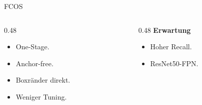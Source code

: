 \begin{frame}{FCOS}
\small
\begin{columns}[T,onlytextwidth]
\begin{column}{0.48\textwidth}
\begin{itemize}
    \item One-Stage.
    \item Anchor-free.
    \item Boxränder direkt.
    \item Weniger Tuning.
\end{itemize}
\end{column}
\begin{column}{0.48\textwidth}
\textbf{Erwartung}
\begin{itemize}
    \item Hoher Recall.
    \item ResNet50-FPN.
\end{itemize}
\end{column}
\end{columns}
\end{frame}

